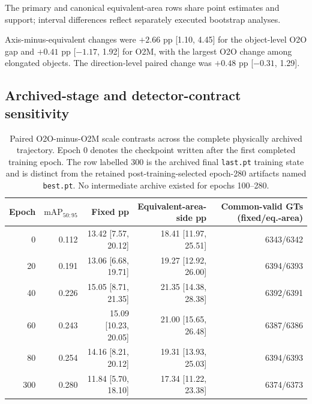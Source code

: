 \documentclass[preprint,10pt]{elsarticle}
\begin{document}
The primary and canonical equivalent-area rows share point estimates and support; interval differences reflect separately executed bootstrap analyses.

\begin{table}[ht]
\centering
\caption{Aspect-stratified scale contrasts under the two displacement parameterisations (pp), with raw counts, inverse-inclusion-weighted support and 95\% paired stratified image-cluster bootstrap intervals.}
\resizebox{\textwidth}{!}{}
\end{table}

Axis-minus-equivalent changes were $+2.66$ pp [1.10, 4.45] for the object-level O2O gap and $+0.41$ pp [$-1.17$, 1.92] for O2M, with the largest O2O change among elongated objects. The direction-level paired change was $+0.48$ pp [$-0.31$, 1.29].

\subsection{Archived-stage and detector-contract sensitivity}

\begin{table}[ht]
\centering
\caption{Paired O2O-minus-O2M scale contrasts across the complete physically archived trajectory. Epoch 0 denotes the checkpoint written after the first completed training epoch. The row labelled 300 is the archived final \texttt{last.pt} training state and is distinct from the retained post-training-selected epoch-280 artifacts named \texttt{best.pt}. No intermediate archive existed for epochs 100--280.}
\begin{tabular}{@{}rrrrr@{}}
\toprule
Epoch & $\mathrm{mAP}_{50:95}$ & Fixed pp & Equivalent-area-side pp & Common-valid GTs (fixed/eq.-area) \\
\midrule
0 & 0.112 & 13.42 [7.57, 20.12] & 18.41 [11.97, 25.51] & 6343/6342 \\
20 & 0.191 & 13.06 [6.68, 19.71] & 19.27 [12.92, 26.00] & 6394/6393 \\
40 & 0.226 & 15.05 [8.71, 21.35] & 21.35 [14.38, 28.38] & 6392/6391 \\
60 & 0.243 & 15.09 [10.23, 20.05] & 21.00 [15.65, 26.48] & 6387/6386 \\
80 & 0.254 & 14.16 [8.21, 20.12] & 19.31 [13.93, 25.03] & 6394/6393 \\
300 & 0.280 & 11.84 [5.70, 18.10] & 17.34 [11.22, 23.38] & 6374/6373 \\
\bottomrule
\end{tabular}
\end{table}
\end{document}
